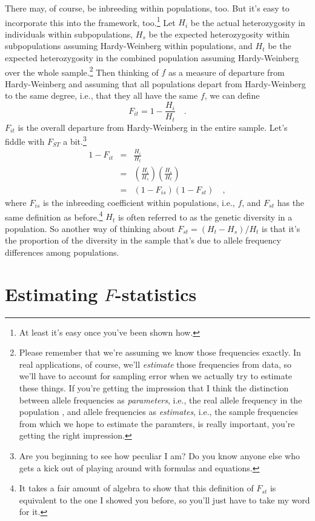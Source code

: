 There may, of course, be inbreeding within populations, too. But it's
easy to incorporate this into the framework, too.\footnote{At least
  it's easy once you've been shown how.} Let $H_i$ be the actual
heterozygosity in individuals within subpopulations, $H_s$ be the
expected heterozygosity within subpopulations assuming Hardy-Weinberg
within populations, and $H_t$ be the expected heterozygosity in the
combined population assuming Hardy-Weinberg over the whole
sample.\footnote{Please remember that we're assuming we know those
  frequencies exactly. In real applications, of course, we'll {\it
    estimate\/} those frequencies from data, so we'll have to account
  for sampling error when we actually try to estimate these things. If
  you're getting the impression that I think the distinction between
  allele frequencies as {\it parameters\/}, i.e., the real allele
  frequency in the population , and allele frequencies as {\it
    estimates\/}, i.e., the sample frequencies from which we hope to
  estimate the paramters, is really important, you're getting the
  right impression.}  Then thinking of $f$ as a measure of departure
from Hardy-Weinberg and assuming that all populations depart from
Hardy-Weinberg to the same degree, i.e., that they all have the same
$f$, we can define
\[
F_{it} = 1 - \frac{H_i}{H_t} \quad .
\]
$F_{it}$ is the overall departure from Hardy-Weinberg in the entire
sample. Let's fiddle with $F_{ST}$ a bit.\footnote{Are you beginning
  to see how peculiar I am? Do you know anyone else who gets a kick
  out of playing around with formulas and equations.}
\begin{eqnarray*}
1 - F_{it} &=& \frac{H_i}{H_t} \\
           &=& \left(\frac{H_i}{H_s}\right)\left(\frac{H_s}{H_t}\right) \\
           &=& (1 - F_{is})(1 - F_{st}) \quad ,
\end{eqnarray*}
where $F_{is}$ is the inbreeding coefficient within populations, i.e.,
$f$, and $F_{st}$ has the same definition as before.\footnote{It takes
  a fair amount of algebra to show that this definition of $F_{st}$ is
  equivalent to the one I showed you before, so you'll just have to
  take my word for it.} $H_t$ is often referred to as the genetic
diversity in a population. So another way of thinking about $F_{st} =
(H_t - H_s)/H_t$ is that it's the proportion of the diversity in the
sample that's due to allele frequency differences among populations.

\section*{Estimating $F$-statistics}

